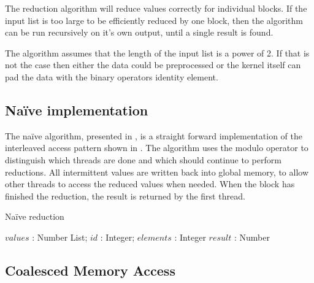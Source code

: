 
The reduction algorithm will reduce values correctly for individual
blocks. If the input list is too large to be efficiently reduced by
one block, then the algorithm can be run recursively on it's own
output, until a single result is found.

The algorithm assumes that the length of the input list is a power of
2. If that is not the case then either the data could be preprocessed
or the kernel itself can pad the data with the binary operators
identity element.

\subsection{Naïve implementation}

The naïve algorithm, presented in , is a
straight forward implementation of the interleaved access pattern
shown in . The algorithm uses the modulo operator
to distinguish which threads are done and which should continue to
perform reductions. All intermittent values are written back into
global memory, to allow other threads to access the reduced values
when needed. When the block has finished the reduction, the result
is returned by the first thread.

\begin{algorithm}
  \caption{Naïve reduction}
  \label{alg:naiveReduct}
  \begin{algorithmic}
              {$values$ : Number List; $id$ : Integer; $elements$ : Integer}
              {$result$ : Number}
              {
                  \ENDIF
                  \SYNC
                \ENDWHILE
                \ENDIF
              }
  \end{algorithmic}
\end{algorithm}

\subsection{Coalesced Memory Access}

